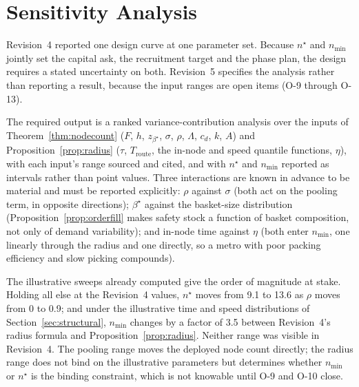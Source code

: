 \documentclass[10pt,twocolumn,letterpaper]{article}
\theoremstyle{definition}
\begin{document}
\section{Sensitivity Analysis}

Revision~4 reported one design curve at one parameter set. Because $n^\star$ and $n_{\min}$ jointly set the capital ask, the recruitment target and the phase plan, the design requires a stated uncertainty on both. Revision~5 specifies the analysis rather than reporting a result, because the input ranges are open items (O-9 through O-13).

The required output is a ranked variance-contribution analysis \cite{saltelli2008} over the inputs of Theorem~\ref{thm:nodecount} ($F$, $h$, $z_{\beta^\star}$, $\sigma$, $\rho$, $\Lambda$, $c_d$, $k$, $A$) and Proposition~\ref{prop:radius} ($\tau$, $T_{\mathrm{route}}$, the in-node and speed quantile functions, $\eta$), with each input's range sourced and cited, and with $n^\star$ and $n_{\min}$ reported as intervals rather than point values. Three interactions are known in advance to be material and must be reported explicitly: $\rho$ against $\sigma$ (both act on the pooling term, in opposite directions); $\beta^\star$ against the basket-size distribution (Proposition~\ref{prop:orderfill} makes safety stock a function of basket composition, not only of demand variability); and in-node time against $\eta$ (both enter $n_{\min}$, one linearly through the radius and one directly, so a metro with poor packing efficiency and slow picking compounds).

The illustrative sweeps already computed give the order of magnitude at stake. Holding all else at the Revision~4 values, $n^\star$ moves from 9.1 to 13.6 as $\rho$ moves from 0 to 0.9; and under the illustrative time and speed distributions of Section~\ref{sec:structural}, $n_{\min}$ changes by a factor of 3.5 between Revision~4's radius formula and Proposition~\ref{prop:radius}. Neither range was visible in Revision~4. The pooling range moves the deployed node count directly; the radius range does not bind on the illustrative parameters but determines whether $n_{\min}$ or $n^\star$ is the binding constraint, which is not knowable until O-9 and O-10 close.
\end{document}
